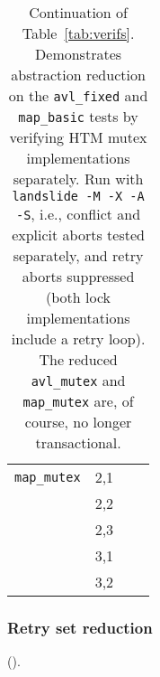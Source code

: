 \begin{table}[h]
\begin{center}
\begin{tabular}{cc||r|r}
			\cline{1-4}
			{\tt map\_mutex}
			& 2,1 & \\ %
			& 2,2 & \\ %
			& 2,3 & \\ %
			& 3,1 & \\ %
			& 3,2 & \\ %
		\end{tabular}
	\end{center}
	\caption{Continuation of Table~\ref{tab:verifs}.
		Demonstrates abstraction reduction \cite{dbug-phdthesis}
		on the {\tt avl\_fixed} and {\tt map\_basic} tests
		by verifying HTM mutex implementations separately.
		Run with {\tt landslide -M -X -A -S}, i.e.,
		conflict and explicit aborts tested separately,
		and retry aborts suppressed
		(both lock implementations include a retry loop).
		The reduced {\tt avl\_mutex} and {\tt map\_mutex} are, of course, no longer transactional.
		}
	\label{tab:verifs2}
\end{table}

\subsubsection{Retry set reduction}
\label{sec:tm-eval-retrysets}


(\sect{\ref{sec:tm-retrysets}}).




